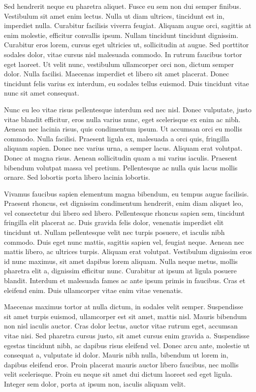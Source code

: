Sed hendrerit neque eu pharetra aliquet. Fusce eu sem non dui semper finibus.
Vestibulum sit amet enim lectus. Nulla ut diam ultrices, tincidunt est in,
imperdiet nulla. Curabitur facilisis viverra feugiat. Aliquam augue orci,
sagittis at enim molestie, efficitur convallis ipsum. Nullam tincidunt
tincidunt dignissim. Curabitur eros lorem, cursus eget ultricies ut,
sollicitudin at augue. Sed porttitor sodales dolor, vitae cursus nisl malesuada
commodo. In rutrum faucibus tortor eget laoreet. Ut velit nunc, vestibulum
ullamcorper orci non, dictum semper dolor. Nulla facilisi. Maecenas imperdiet
et libero sit amet placerat. Donec tincidunt felis varius ex interdum, eu
sodales tellus euismod. Duis tincidunt vitae nunc sit amet consequat.

Nunc eu leo vitae risus pellentesque interdum sed nec nisl. Donec vulputate,
justo vitae blandit efficitur, eros nulla varius nunc, eget scelerisque ex enim
ac nibh. Aenean nec lacinia risus, quis condimentum ipsum. Ut accumsan orci eu
mollis commodo. Nulla facilisi. Praesent ligula ex, malesuada a orci quis,
fringilla aliquam sapien. Donec nec varius urna, a semper lacus. Aliquam erat
volutpat. Donec at magna risus. Aenean sollicitudin quam a mi varius iaculis.
Praesent bibendum volutpat massa vel pretium. Pellentesque ac nulla quis lacus
mollis ornare. Sed lobortis porta libero lacinia lobortis.

Vivamus faucibus sapien elementum magna bibendum, eu tempus augue facilisis.
Praesent rhoncus, est dignissim condimentum hendrerit, enim diam aliquet leo,
vel consectetur dui libero sed libero. Pellentesque rhoncus sapien sem,
tincidunt fringilla elit placerat ac. Duis gravida felis dolor, venenatis
imperdiet elit tincidunt ut. Nullam pellentesque velit nec turpis posuere, et
iaculis nibh commodo. Duis eget nunc mattis, sagittis sapien vel, feugiat
neque. Aenean nec mattis libero, ac ultrices turpis. Aliquam erat volutpat.
Vestibulum dignissim eros id nunc maximus, sit amet dapibus lorem aliquam.
Nulla neque metus, mollis pharetra elit a, dignissim efficitur nunc. Curabitur
at ipsum at ligula posuere blandit. Interdum et malesuada fames ac ante ipsum
primis in faucibus. Cras et eleifend enim. Duis ullamcorper vitae enim vitae
venenatis.

Maecenas maximus tortor at nulla dictum, in sodales velit semper. Suspendisse
sit amet turpis euismod, ullamcorper est sit amet, mattis nisl. Mauris bibendum
non nisl iaculis auctor. Cras dolor lectus, auctor vitae rutrum eget, accumsan
vitae nisi. Sed pharetra cursus justo, sit amet cursus enim gravida a.
Suspendisse egestas tincidunt nibh, ac dapibus risus eleifend vel. Donec arcu
ante, molestie ut consequat a, vulputate id dolor. Mauris nibh nulla, bibendum
ut lorem in, dapibus eleifend eros. Proin placerat mauris auctor libero
faucibus, nec mollis velit scelerisque. Proin eu neque sit amet dui dictum
laoreet sed eget ligula. Integer sem dolor, porta at ipsum non, iaculis aliquam
velit.

